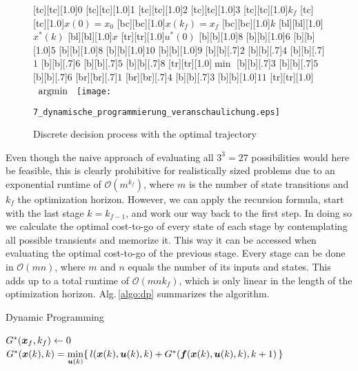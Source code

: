 \begin{figure}[h]
	[tc][tc][1.0]{0}
	[tc][tc][1.0]{1}
	[tc][tc][1.0]{2}
	[tc][tc][1.0]{3}
	[tc][tc][1.0]{$k_f$}
	[tc][tc][1.0]{$x(0) = x_0$}
	[bc][bc][1.0]{$x(k_f) = x_f$}
	[bc][bc][1.0]{$k$}
	[bl][bl][1.0]{$x^\ast(k)$}
	[bl][bl][1.0]{$x$}
	[tr][tr][1.0]{$u^\ast(0)$}
	[b][1.0]{$8$}
	[b][1.0]{$6$}
	[b][1.0]{$5$}
	[b][1.0]{$8$}
	[b][1.0]{$10$}
	[b][1.0]{$9$}
	[b][.7]{$2$}
	[b][.7]{$4$}
	[b][.7]{$1$}
	[b][.7]{$6$}
	[b][.7]{$5$}
	[b][.7]{$8$}
	[tr][tr][1.0]{$\min$}
	[b][.7]{$3$}
	[b][.7]{$5$}
	[b][.7]{$6$}
	[br][br][.7]{$1$}
	[br][br][.7]{$4$}
	[b][.7]{$3$}
	[b][1.0]{$11$}
	[tr][tr][1.0]{$\argmin{}$}
	\centering
  	\texttt{[image: 7\_dynamische\_programmierung\_veranschaulichung.eps]}
	\caption[Discrete decision process]{Discrete decision process with the optimal trajectory}
	\label{fig:dynamische_programmierung_veranschaulichung}
\end{figure} 
Even though the naive approach of evaluating all $3^3 = 27$ possibilities would here be feasible, this is clearly prohibitive for realistically sized problems due to an exponential runtime of $\mathcal O(m^{k_f})$, where $m$ is the number of state transitions and $k_f$ the optimization horizon. 
However, we can apply the recursion formula, start with the last stage $k=k_{f-1}$, and work our way back to the first step. 
In doing so we calculate the optimal cost-to-go of every state of each stage by contemplating all possible transients and memorize it. 
This way it can be accessed when evaluating the optimal cost-to-go of the previous stage. Every stage can be done in $\mathcal O(m n)$, where $m$ and $n$ equals the number of its inputs and states. 
This adds up to a total runtime of $\mathcal O(m n k_f)$, which is only linear in the length of the optimization horizon. Alg.\,\ref{algo:dp} summarizes the algorithm.
%
%
\begin{algorithm}
  \caption[Dynamic Programming]{Dynamic Programming}
 \begin{algorithmic}[1]
	\STATE $G^\ast(\boldsymbol{x}_f,k_f) \leftarrow 0$
			\STATE $G^\ast(\boldsymbol{x}(k),k) = \underset{\boldsymbol{u}(k)}{\min}\{\,l(\boldsymbol{x}(k), \boldsymbol{u}(k), k) + G^\ast(\boldsymbol{f}(\boldsymbol{x}(k), \boldsymbol{u}(k), k),k+1)\,\}$
		\ENDFOR
	\ENDFOR
\label{algo:dp}
 \end{algorithmic}
 \end{algorithm}
